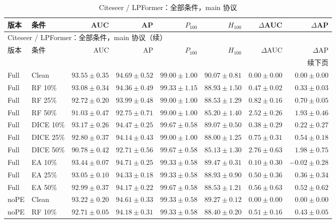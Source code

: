 {\footnotesize
\setlength{\tabcolsep}{3.2pt}
\renewcommand{\arraystretch}{1.10}
\begin{longtable}{llrrrrrr}
\caption{Citeseer / LPFormer：全部条件，main 协议}\\
\toprule
版本 & 条件 & AUC & AP & $P_{100}$ & $H_{100}$ & $\Delta$AUC & $\Delta$AP \\
\midrule
\endfirsthead
\multicolumn{8}{l}{Citeseer / LPFormer：全部条件，main 协议（续）}\\
\toprule
版本 & 条件 & AUC & AP & $P_{100}$ & $H_{100}$ & $\Delta$AUC & $\Delta$AP \\
\midrule
\endhead
\midrule\multicolumn{8}{r}{续下页}\\
\endfoot
\bottomrule
\endlastfoot
Full & Clean & $93.55\pm0.35$ & $94.69\pm0.52$ & $99.00\pm1.00$ & $90.07\pm0.81$ & $0.00\pm0.00$ & $0.00\pm0.00$ \\
Full & RF 10\% & $93.08\pm0.34$ & $94.36\pm0.49$ & $99.33\pm1.15$ & $88.93\pm1.50$ & $0.47\pm0.02$ & $0.33\pm0.03$ \\
Full & RF 25\% & $92.72\pm0.20$ & $93.99\pm0.48$ & $99.00\pm1.00$ & $88.53\pm1.29$ & $0.82\pm0.16$ & $0.70\pm0.05$ \\
Full & RF 50\% & $91.03\pm0.47$ & $92.75\pm0.71$ & $99.00\pm1.00$ & $85.20\pm1.40$ & $2.52\pm0.26$ & $1.93\pm0.46$ \\
Full & DICE 10\% & $93.17\pm0.26$ & $94.47\pm0.25$ & $99.67\pm0.58$ & $89.07\pm0.50$ & $0.38\pm0.29$ & $0.22\pm0.27$ \\
Full & DICE 25\% & $92.80\pm0.37$ & $94.14\pm0.43$ & $99.00\pm1.00$ & $88.00\pm1.25$ & $0.75\pm0.31$ & $0.54\pm0.18$ \\
Full & DICE 50\% & $90.78\pm0.42$ & $92.71\pm0.56$ & $99.67\pm0.58$ & $85.13\pm1.30$ & $2.76\pm0.63$ & $1.98\pm0.75$ \\
Full & EA 10\% & $93.44\pm0.07$ & $94.71\pm0.25$ & $99.33\pm0.58$ & $89.47\pm0.31$ & $0.10\pm0.30$ & $-0.02\pm0.28$ \\
Full & EA 25\% & $93.05\pm0.10$ & $94.33\pm0.18$ & $99.33\pm0.58$ & $88.93\pm0.90$ & $0.50\pm0.36$ & $0.36\pm0.34$ \\
Full & EA 50\% & $92.99\pm0.37$ & $94.17\pm0.22$ & $99.67\pm0.58$ & $88.53\pm1.21$ & $0.56\pm0.63$ & $0.52\pm0.62$ \\
noPE & Clean & $93.22\pm0.20$ & $94.61\pm0.33$ & $99.33\pm0.58$ & $89.27\pm0.12$ & $0.00\pm0.00$ & $0.00\pm0.00$ \\
noPE & RF 10\% & $92.71\pm0.05$ & $94.18\pm0.31$ & $99.33\pm0.58$ & $88.40\pm0.20$ & $0.51\pm0.16$ & $0.43\pm0.05$ \\

\end{longtable}}
